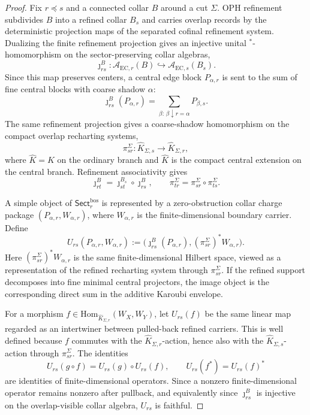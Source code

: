 \documentclass[11pt]{article}
\begin{document}
\begin{proof}
Fix \(r\preceq s\) and a connected collar \(B\) around a cut \(\Sigma\). OPH refinement subdivides
\(B\) into a refined collar \(B_s\) and carries overlap records by the deterministic projection maps
of the separated cofinal refinement system. Dualizing the finite refinement projection gives an
injective unital \(^*\)-homomorphism on the sector-preserving collar algebras,
\[
\jmath_{rs}^{B}:\mathcal A_{\mathrm{EC},r}(B)\hookrightarrow
\mathcal A_{\mathrm{EC},s}(B_s).
\]
Since this map preserves centers, a central edge block \(P_{\alpha,r}\) is sent to the sum of fine
central blocks with coarse shadow \(\alpha\):
\[
\jmath_{rs}^{B}(P_{\alpha,r})
=
\sum_{\beta:\,\beta\downarrow r=\alpha}P_{\beta,s}.
\]
The same refinement projection gives a coarse-shadow homomorphism on the compact overlap
recharting systems,
\[
\pi_{sr}^{\Sigma}:\widehat K_{\Sigma,s}\to \widehat K_{\Sigma,r},
\]
where \(\widehat K=K\) on the ordinary branch and \(\widehat K\) is the compact central extension
on the central branch. Refinement associativity gives
\[
\jmath_{rt}^{B}=\jmath_{st}^{B_s}\circ\jmath_{rs}^{B},
\qquad
\pi_{tr}^{\Sigma}=\pi_{sr}^{\Sigma}\circ\pi_{ts}^{\Sigma}.
\]

A simple object of \(\mathsf{Sect}^{\mathrm{bos}}_r\) is represented by a zero-obstruction collar
charge package \((P_{\alpha,r},W_{\alpha,r})\), where \(W_{\alpha,r}\) is the finite-dimensional
boundary carrier. Define
\[
U_{rs}(P_{\alpha,r},W_{\alpha,r})
:=
\bigl(\jmath_{rs}^{B}(P_{\alpha,r}),(\pi_{sr}^{\Sigma})^\ast W_{\alpha,r}\bigr).
\]
Here \((\pi_{sr}^{\Sigma})^\ast W_{\alpha,r}\) is the same finite-dimensional Hilbert space,
viewed as a representation of the refined recharting system through \(\pi_{sr}^{\Sigma}\). If the
refined support decomposes into fine minimal central projectors, the image object is the
corresponding direct sum in the additive Karoubi envelope.

For a morphism \(f\in\mathrm{Hom}_{\widehat K_{\Sigma,r}}(W_X,W_Y)\), let \(U_{rs}(f)\) be the same
linear map regarded as an intertwiner between pulled-back refined carriers. This is well defined
because \(f\) commutes with the \(\widehat K_{\Sigma,r}\)-action, hence also with the
\(\widehat K_{\Sigma,s}\)-action through \(\pi_{sr}^{\Sigma}\). The identities
\[
U_{rs}(g\circ f)=U_{rs}(g)\circ U_{rs}(f),
\qquad
U_{rs}(f^\ast)=U_{rs}(f)^\ast
\]
are identities of finite-dimensional operators. Since a nonzero finite-dimensional operator remains
nonzero after pullback, and equivalently since \(\jmath_{rs}^{B}\) is injective on the
overlap-visible collar algebra, \(U_{rs}\) is faithful.


\end{proof}
\end{document}
